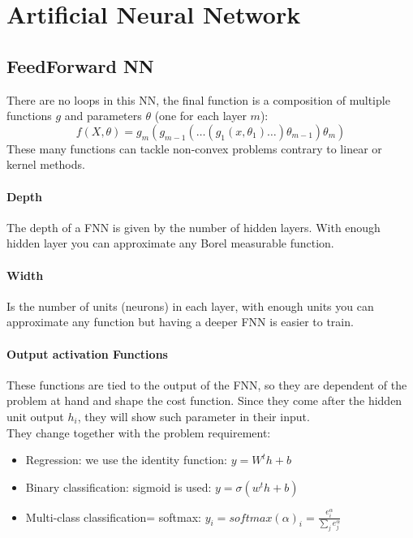\section{Artificial Neural Network}

\subsection{FeedForward NN}

There are no loops in this NN, the final function is a composition of multiple functions $g$ and parameters $\theta$ (one for each layer $m$):
$$f(X,\theta)=g_m(g_{m-1}(\dots(g_1(x,\theta_1)\dots)\theta_{m-1})\theta_m)$$
These many functions can tackle non-convex problems contrary to linear or kernel methods.\\

\paragraph{Depth}
The depth of a FNN is given by the number of hidden layers. With enough hidden layer you can  approximate any Borel measurable function.

\paragraph{Width}
Is the number of units (neurons) in each layer, with enough units you can approximate any function but having a deeper FNN is easier to train.



\paragraph{Output activation Functions}
These functions are tied to the output of the FNN, so they are dependent of the problem at hand and shape the cost function. Since they come after the hidden unit output $h_i$, they will show such parameter in their input.\\
They change together with the problem requirement:
\begin{itemize}
\item Regression: we use the identity function: $y=W^th+b$
\item Binary classification: sigmoid is used: $y=\sigma(w^th+b)$
\item  Multi-class classification= softmax: $y_i=softmax(\alpha)_i=\frac{e^\alpha_i}{\sum_j e^\alpha_j}$
\end{itemize}



